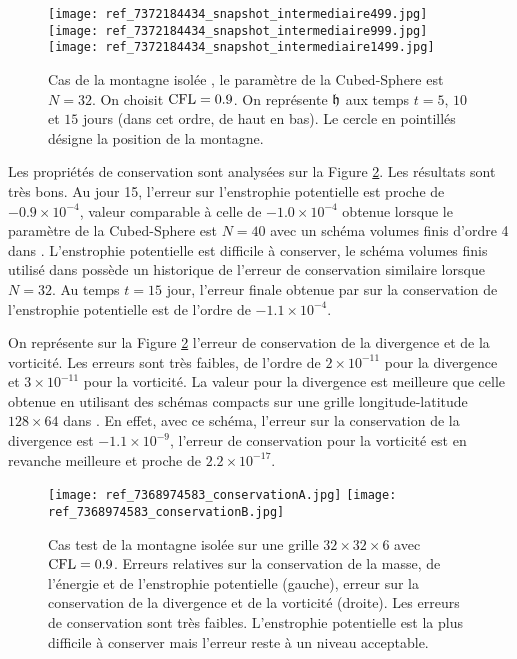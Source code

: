 \begin{figure}[htbp]
\begin{center}
\texttt{[image: ref\_7372184434\_snapshot\_intermediaire499.jpg]}\\
\texttt{[image: ref\_7372184434\_snapshot\_intermediaire999.jpg]}\\
\texttt{[image: ref\_7372184434\_snapshot\_intermediaire1499.jpg]}
\end{center}
\caption{Cas de la montagne isolée \cite{Williamson1992}, le paramètre de la Cubed-Sphere est $N=32$. On choisit $\text{CFL}=0.9$.  On représente $\mathfrak{h}$ aux temps $t=5$, $10$ et $15$ jours (dans cet ordre, de haut en bas). Le cercle en pointillés désigne la position de la montagne.}
\label{fig: williamson 5 space height}
\end{figure}

Les propriétés de conservation sont analysées sur la Figure \ref{fig: williamson 5 conservation}. Les résultats sont très bons. Au jour 15, l'erreur sur l'enstrophie potentielle est proche de $-0.9 \times 10^{-4}$, valeur comparable à celle de $-1.0 \times 10^{-4}$ obtenue lorsque le paramètre de la Cubed-Sphere est $N=40$ avec un schéma volumes finis d'ordre 4 dans \cite{Ullrich2010}. L'enstrophie potentielle est difficile à conserver, le schéma volumes finis utilisé dans \cite{Chen2008} possède un historique de l'erreur de conservation similaire lorsque $N=32$. Au temps $t=15$ jour, l'erreur finale obtenue par \cite{Chen2008} sur la conservation de l'enstrophie potentielle est de l'ordre de $-1.1 \times 10^{-4}$.

On représente sur la Figure \ref{fig: williamson 5 conservation} l'erreur de conservation de la divergence et de la vorticité. Les erreurs sont très faibles, de l'ordre de $2 \times 10^{-11}$ pour la divergence et $3 \times 10^{-11}$ pour la vorticité. La valeur pour la divergence est meilleure que celle obtenue en utilisant des schémas compacts sur une grille longitude-latitude $128 \times 64$ dans \cite{Nihei2003}. En effet, avec ce schéma, l'erreur sur la conservation de la divergence est $-1.1 \times 10^{-9}$, l'erreur de conservation pour la vorticité est en revanche meilleure et proche de $2.2 \times 10^{-17}$. 

\begin{figure}[htbp]
\begin{center}
\texttt{[image: ref\_7368974583\_conservationA.jpg]}
\texttt{[image: ref\_7368974583\_conservationB.jpg]}
\end{center}
\caption{Cas test de la montagne isolée \cite{Williamson1992} sur une grille $32 \times 32 \times 6$ avec $\text{CFL}=0.9$. Erreurs relatives sur la conservation de la masse, de l'énergie et de l'enstrophie potentielle (gauche), erreur sur la conservation de la divergence et de la vorticité (droite). Les erreurs de conservation sont très faibles. L'enstrophie potentielle est la plus difficile à conserver mais l'erreur reste à un niveau acceptable.}
\label{fig: williamson 5 conservation}
\end{figure}


